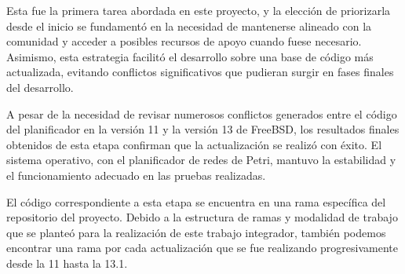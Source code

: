 Esta fue la primera tarea abordada en este proyecto, y la elección de priorizarla desde el inicio se fundamentó en la necesidad de mantenerse alineado con la comunidad y acceder a posibles recursos de apoyo cuando fuese necesario. Asimismo, esta estrategia facilitó el desarrollo sobre una base de código más actualizada, evitando conflictos significativos que pudieran surgir en fases finales del desarrollo.\par

A pesar de la necesidad de revisar numerosos conflictos generados entre el código del planificador en la versión 11 y la versión 13 de FreeBSD, los resultados finales obtenidos de esta etapa confirman que la actualización se realizó con éxito. El sistema operativo, con el planificador de redes de Petri, mantuvo la estabilidad y el funcionamiento adecuado en las pruebas realizadas.\par

El código correspondiente a esta etapa se encuentra en una rama específica del repositorio del proyecto. Debido a la estructura de ramas y modalidad de trabajo que se planteó para la realización de este trabajo integrador, también podemos encontrar una rama por cada actualización que se fue realizando progresivamente desde la 11 hasta la 13.1.\par



